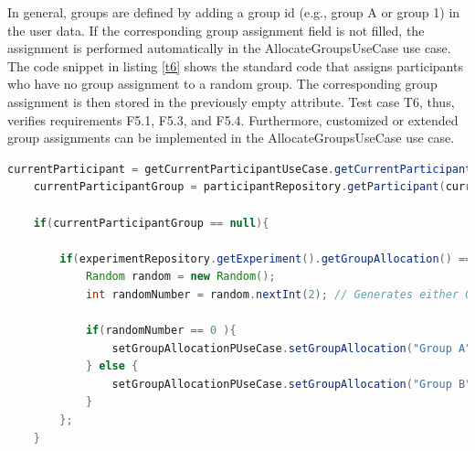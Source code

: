 In general, groups are defined by adding a group \ac{id} (e.g., group A or group 1) in the user data. If the corresponding group assignment field is not filled, the assignment is performed automatically in the AllocateGroupsUseCase use case. The code snippet in listing \ref{t6} shows the standard code that assigns participants who have no group assignment to a random group. The corresponding group assignment is then stored in the previously empty attribute. Test case T6, thus, verifies requirements F5.1, F5.3, and F5.4. Furthermore, customized or extended group assignments can be implemented in the AllocateGroupsUseCase use case.


\vspace{0.5cm}

\begin{lstlisting}[language=java,label=t6,lineskip={0pt}, caption=T6: Allocation of Groups, basicstyle=\scriptsize, captionpos=b]
    currentParticipant = getCurrentParticipantUseCase.getCurrentParticipant();
    currentParticipantGroup = participantRepository.getParticipant(currentParticipant).getGroupAllocation();
    
    if(currentParticipantGroup == null){
    
        if(experimentRepository.getExperiment().getGroupAllocation() == "random"){
            Random random = new Random();
            int randomNumber = random.nextInt(2); // Generates either 0 or 1
    
            if(randomNumber == 0 ){
                setGroupAllocationPUseCase.setGroupAllocation("Group A", currentParticipant);
            } else {
                setGroupAllocationPUseCase.setGroupAllocation("Group B", currentParticipant);
            }
        };
    }
\end{lstlisting}

\newpage


